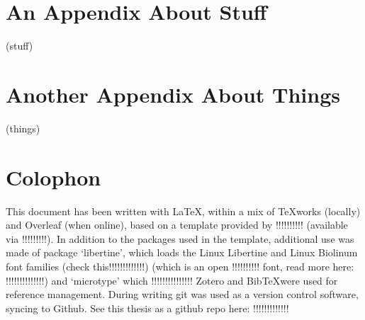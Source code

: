
\appendix
\chapter{An Appendix About Stuff}
\label{appendixlabel1}
(stuff)

\chapter{Another Appendix About Things}
\label{appendixlabel2}
(things)

\chapter{Colophon}
\label{appendixlabel3}

This document has been written with \LaTeX, within a mix of TeXworks (locally) and Overleaf (when online), based on a template provided by !!!!!!!!!! (available via !!!!!!!!!).
In addition to the packages used in the template, additional use was made of package `libertine', which loads the Linux Libertine and Linux Biolinum font families (check this!!!!!!!!!!!!!) (which is an open !!!!!!!!!! font, read more here: !!!!!!!!!!!!!!) and `microtype' which !!!!!!!!!!!!!!!
Zotero and Bib\TeX were used for reference management.
During writing git was used as a version control software, syncing to Github. See this thesis as a github repo here: !!!!!!!!!!!!!

%

